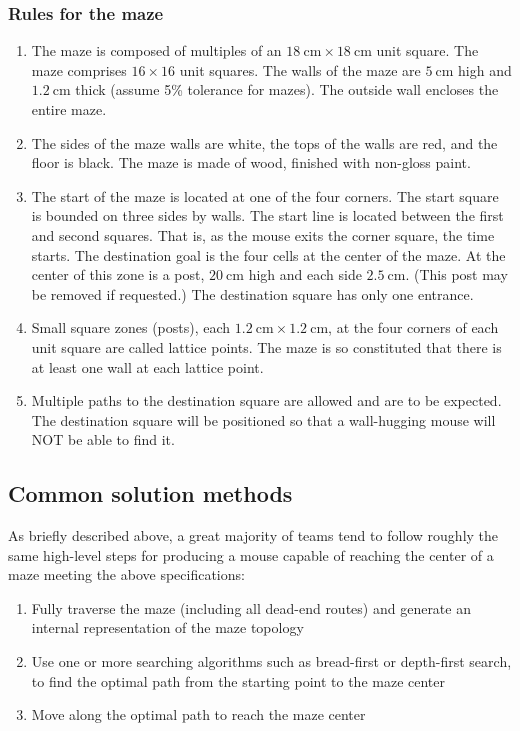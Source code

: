 \documentclass[10pt,twocolumn,letterpaper]{article}
\begin{document}
\subsubsection{Rules for the maze}
\label{ssub:mazerules}
\begin{enumerate}
	\item The maze is composed of multiples of an $18\ \textrm{cm} \times 18\ \textrm{cm}$ unit square. The maze
       comprises $16 \times 16$ unit squares. The walls of the maze are $5\ \textrm{cm}$ high and $1.2\ \textrm{cm}$
       thick (assume 5\% tolerance for mazes). The outside wall encloses the entire maze.
	\item The sides of the maze walls are white, the tops of the walls are red, and the floor is black. The maze is made
       of wood, finished with non-gloss paint.
	\item The start of the maze is located at one of the four corners. The start square is bounded on three sides by
       walls. The start line is located between the first and second squares. That is, as the mouse exits the corner
       square, the time starts. The destination goal is the four cells at the center of the maze. At the center of this
       zone is a post, $20\ \textrm{cm}$ high and each side $2.5\ \textrm{cm}$. (This post may be removed if requested.)
       The destination square has only one entrance.
	\item Small square zones (posts), each $1.2\ \textrm{cm} \times 1.2\ \textrm{cm}$, at the four corners of each unit
       square are called lattice points. The maze is so constituted that there is at least one wall at each lattice
       point.
	\item Multiple paths to the destination square are allowed and are to be expected. The destination square will be
       positioned so that a wall-hugging mouse will NOT be able to find it.
\end{enumerate}

\subsection{Common solution methods}
\label{sub:solutionmethods}
As briefly described above, a great majority of teams tend to follow roughly the same high-level steps for producing a
mouse capable of reaching the center of a maze meeting the above specifications:

\begin{enumerate}
	\item Fully traverse the maze (including all dead-end routes) and generate an internal representation of the maze
	topology
	\item Use one or more searching algorithms such as bread-first or depth-first search, to find the optimal path from
	the starting point to the maze center
	\item Move along the optimal path to reach the maze center
\end{enumerate}
\end{document}
